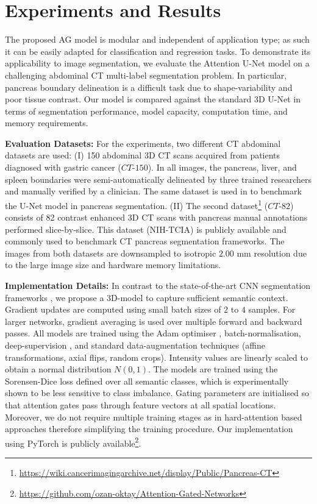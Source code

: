 \documentclass{article}
\begin{document}
\section{Experiments and Results}

The proposed AG model is modular and independent of application type; as such it can be easily adapted for classification and regression tasks. To demonstrate its applicability to image segmentation, we evaluate the Attention U-Net model on a challenging abdominal CT multi-label segmentation problem. In particular, pancreas boundary delineation is a difficult task due to shape-variability and poor tissue contrast. Our model is compared against the standard 3D U-Net in terms of segmentation performance, model capacity, computation time, and memory requirements. 

\textbf{Evaluation Datasets:} For the experiments, two different CT abdominal datasets are used: (I) 150 abdominal 3D CT scans acquired from patients diagnosed with gastric cancer ($CT$-$150$). In all images, the pancreas, liver, and spleen boundaries were semi-automatically delineated by three trained researchers and manually verified by a clinician. The same dataset is used in \cite{roth2017hierarchical} to benchmark the U-Net model in pancreas segmentation. (II) The second dataset\footnote{\url{https://wiki.cancerimagingarchive.net/display/Public/Pancreas-CT}} ($CT$-$82$) consists of 82 contrast enhanced 3D CT scans with pancreas manual annotations performed slice-by-slice. This dataset (NIH-TCIA) \cite{tciapancreas} is publicly available and commonly used to benchmark CT pancreas segmentation frameworks. The images from both datasets are downsampled to isotropic $2.00$ mm resolution due to the large image size and hardware memory limitations. 

\textbf{Implementation Details:} In contrast to the state-of-the-art CNN segmentation frameworks \cite{cai2017improving, roth2018media}, we propose a 3D-model to capture sufficient semantic context. Gradient updates are computed using small batch sizes of $2$ to $4$ samples. For larger networks, gradient averaging is used over multiple forward and backward passes. All models are trained using the Adam optimiser \cite{kingma2014adam}, batch-normalisation, deep-supervision \cite{lee2015deeply}, and standard data-augmentation techniques (affine transformations, axial flips, random crops). Intensity values are linearly scaled to obtain a normal distribution $N(0,1)$. The models are trained using the Sorensen-Dice loss \cite{milletari2016v} defined over all semantic classes, which is experimentally shown to be less sensitive to class imbalance. Gating parameters are initialised so that attention gates pass through feature vectors at all spatial locations. Moreover, we do not require multiple training stages as in hard-attention based approaches therefore simplifying the training procedure. Our implementation using PyTorch is publicly available\footnote{\url{https://github.com/ozan-oktay/Attention-Gated-Networks}}.
\end{document}
